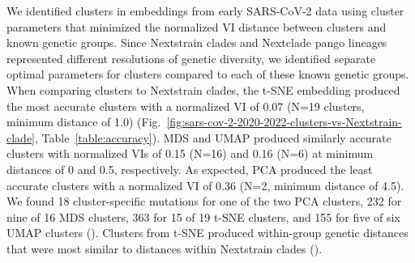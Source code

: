 \documentclass[10pt,letterpaper]{article}
\begin{document}
We identified clusters in embeddings from early SARS-CoV-2 data using cluster parameters that minimized the normalized VI distance between clusters and known genetic groups.
Since Nextstrain clades and Nextclade pango lineages represented different resolutions of genetic diversity, we identified separate optimal parameters for clusters compared to each of these known genetic groups.
When comparing clusters to Nextstrain clades, the t-SNE embedding produced the most accurate clusters with a normalized VI of 0.07 (N=19 clusters, minimum distance of 1.0) (Fig.~\ref{fig:sars-cov-2-2020-2022-clusters-vs-Nextstrain-clade}, Table~\ref{table:accuracy}).
MDS and UMAP produced similarly accurate clusters with normalized VIs of 0.15 (N=16) and 0.16 (N=6) at minimum distances of 0 and 0.5, respectively.
As expected, PCA produced the least accurate clusters with a normalized VI of 0.36 (N=2, minimum distance of 4.5).
We found 18 cluster-specific mutations for one of the two PCA clusters, 232 for nine of 16 MDS clusters, 363 for 15 of 19 t-SNE clusters, and 155 for five of six UMAP clusters ().
Clusters from t-SNE produced within-group genetic distances that were most similar to distances within Nextstrain clades ().
\end{document}

